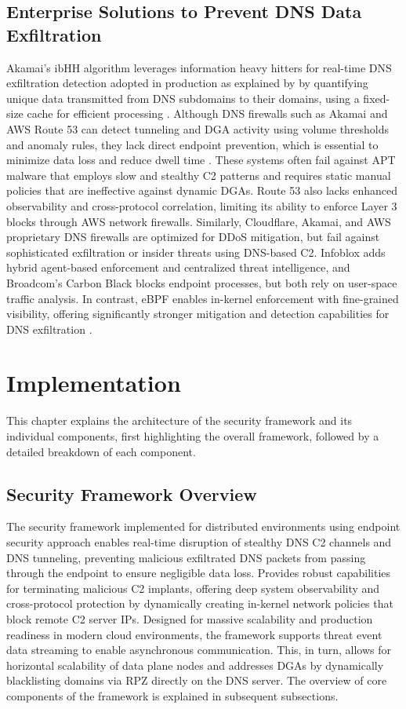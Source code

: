 \documentclass [11pt, proquest] {uwthesis}[2020/02/24]
\begin{document}
\section{Enterprise Solutions to Prevent DNS Data Exfiltration}
Akamai’s ibHH algorithm leverages information heavy hitters for real-time DNS exfiltration detection adopted in production as explained by \citeauthor{ozery2023information} by quantifying unique data transmitted from DNS subdomains to their domains, using a fixed-size cache for efficient processing \cite{ozery2023information}. Although DNS firewalls such as Akamai and AWS Route 53 can detect tunneling and DGA activity using volume thresholds and anomaly rules, they lack direct endpoint prevention, which is essential to minimize data loss and reduce dwell time \cite{ansari2020reinforcing}. These systems often fail against APT malware that employs slow and stealthy C2 patterns and requires static manual policies that are ineffective against dynamic DGAs. 
Route 53 also lacks enhanced observability and cross-protocol correlation, limiting its ability to enforce Layer 3 blocks through AWS network firewalls. Similarly, Cloudflare, Akamai, and AWS proprietary DNS firewalls are optimized for DDoS mitigation, but fail against sophisticated exfiltration or insider threats using DNS-based C2. Infoblox adds hybrid agent-based enforcement and centralized threat intelligence, and Broadcom’s Carbon Black blocks endpoint processes, but both rely on user-space traffic analysis. In contrast, eBPF enables in-kernel enforcement with fine-grained visibility, offering significantly stronger mitigation and detection capabilities for DNS exfiltration \cite{ahmed2019monitoring}.


\chapter{Implementation}
This chapter explains the architecture of the security framework and its individual components, first highlighting the overall framework, followed by a detailed breakdown of each component.
\section{Security Framework Overview}
The security framework implemented for distributed environments using endpoint security approach enables real-time disruption of stealthy DNS C2 channels and DNS tunneling, preventing malicious exfiltrated DNS packets from passing through the endpoint to ensure negligible data loss. Provides robust capabilities for terminating malicious C2 implants, offering deep system observability and cross-protocol protection by dynamically creating in-kernel network policies that block remote C2 server IPs. Designed for massive scalability and production readiness in modern cloud environments, the framework supports threat event data streaming to enable asynchronous communication. This, in turn, allows for horizontal scalability of data plane nodes and addresses DGAs by dynamically blacklisting domains via RPZ directly on the DNS server. The overview of core components of the framework is explained in subsequent subsections. 
\end{document}
